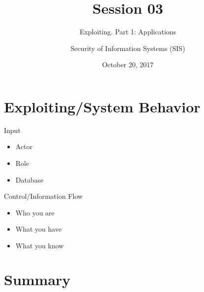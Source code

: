 \documentclass{curs}
\title[Session 03]{Session 03}
\subtitle{Exploiting. Part 1: Applications}
\author{Security of Information Systems (SIS)}
\date{October 20, 2017}
\begin{document}
\frame{\titlepage}

\section{Exploiting/System Behavior}

\begin{frame}{Input}
  \begin{itemize}
    \item Actor
    \item Role
    \item Database
  \end{itemize}
\end{frame}

\begin{frame}{Control/Information Flow}
  \begin{itemize}
    \item Who you are
    \item What you have
    \item What you know
  \end{itemize}
\end{frame}

\section{Summary}
\end{document}
